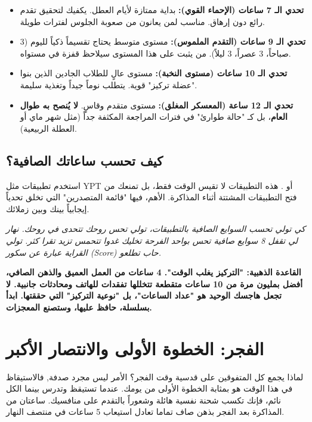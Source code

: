 \documentclass[12pt,a4paper]{book}
\newcommand{\quoteAr}[1]{%
	\begin{myquote}
		\itshape #1
	\end{myquote}
}
\newcommand{\importantAr}[1]{%
	\begin{important}
		\bfseries #1
	\end{important}
}
\begin{document}
	\begin{itemize}
		\item \textbf{تحدي الـ 7 ساعات (الإحماء القوي):} بداية ممتازة لأيام العطل. يكفيك لتحقيق تقدم رائع دون إرهاق. مناسب لمن يعانون من صعوبة الجلوس لفترات طويلة.
		
		\item \textbf{تحدي الـ 9 ساعات (التقدم الملموس):} مستوى متوسط يحتاج تقسيماً ذكياً لليوم (3 صباحاً، 3 عصراً، 3 ليلاً). من يثبت على هذا المستوى سيلاحظ قفزة في مستواه.
		
		\item \textbf{تحدي الـ 10 ساعات (مستوى النخبة):} مستوى عالٍ للطلاب الجادين الذين بنوا "عضلة تركيز" قوية. يتطلب نوماً جيداً وتغذية سليمة.
		
		\item \textbf{تحدي الـ 12 ساعة (المعسكر المغلق):} مستوى متقدم وقاسٍ. \textbf{لا يُنصح به طوال العام}، بل كـ "حالة طوارئ" في فترات المراجعة المكثفة جداً (مثل شهر ماي أو العطلة الربيعية).
	\end{itemize}
	
	\subsection{كيف تحسب ساعاتك الصافية؟}
	
	استخدم تطبيقات مثل YPT أو . هذه التطبيقات لا تقيس الوقت فقط، بل تمنعك من فتح التطبيقات المشتتة أثناء المذاكرة. الأهم، فيها "قائمة المتصدرين" التي تخلق تحدياً إيجابياً بينك وبين زملائك.
	
	\quoteAr{كي تولي تحسب السوايع الصافية بالتطبيقات، تولي تحس روحك تتحدى في روحك. نهار لي تقفل 8 سوايع صافية تحس بواحد الفرحة تخليك غدوا تتحمس تزيد تقرا كثر. تولي القراية عبارة عن سكور (Score) حاب تطلعو.}
	
	\importantAr{القاعدة الذهبية: "التركيز يغلب الوقت". 4 ساعات من العمل العميق والذهن الصافي، أفضل بمليون مرة من 10 ساعات متقطعة تتخللها تفقدات للهاتف ومحادثات جانبية. لا تجعل هاجسك الوحيد هو "عداد الساعات"، بل "نوعية التركيز" التي حققتها. ابدأ بسلسلة، حافظ عليها، وستصنع المعجزات.}
	
	
	\section{ الفجر: الخطوة الأولى والانتصار الأكبر}
	
	لماذا يجمع كل المتفوقين على قدسية وقت الفجر؟ الأمر ليس مجرد صدفة, فالاستيقاظ في هذا الوقت هو بمثابة الخطوة الأولى من يومك. عندما تستيقظ وتدرس بينما الكل نائم، فإنك تكسب شحنة نفسية هائلة وشعوراً بالتقدم على منافسيك. ساعتان من المذاكرة بعد الفجر بذهن صاف تماما تعادل استيعاب 5 ساعات في منتصف النهار.
	
\end{document}
